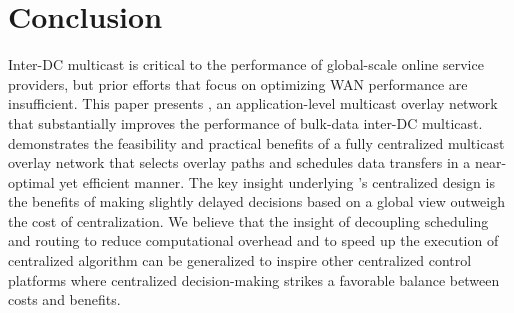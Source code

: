 \section{Conclusion}
Inter-DC multicast is critical to the performance of
global-scale online service providers, but
prior efforts that focus
on optimizing WAN performance are insufficient.
This paper presents \name,
an application-level multicast overlay network that substantially
improves the performance of
bulk-data inter-DC multicast.
\name demonstrates the feasibility
and practical benefits of a fully centralized multicast overlay
network that selects overlay paths and schedules data transfers
in a near-optimal yet efficient manner.
The key insight underlying \name's centralized design is
the benefits of making slightly delayed
decisions based on a global view outweigh the cost of
centralization.%
We believe that the insight of decoupling scheduling and routing to reduce computational overhead and to speed up the execution of centralized algorithm
can be generalized to inspire other centralized control platforms
where centralized decision-making strikes
a favorable balance between costs and benefits.

